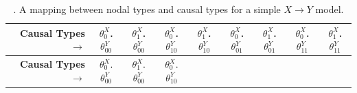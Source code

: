 \documentclass[12pt,]{book}
\begin{document}
\begin{longtable}[]{@{}rcccccccc@{}}
\caption{\label{tab:nodalcausalmatrix}. A mapping between nodal types and causal types for a simple \(X \rightarrow Y\) model.}\tabularnewline
\toprule
\begin{minipage}[b]{0.12\columnwidth}\raggedleft
\textbf{Causal Types \(\rightarrow\)}\strut
\end{minipage} & \begin{minipage}[b]{0.08\columnwidth}\centering
\(\theta^X_0\).\(\theta^Y_{00}\)\strut
\end{minipage} & \begin{minipage}[b]{0.08\columnwidth}\centering
\(\theta^X_1\).\(\theta^Y_{00}\)\strut
\end{minipage} & \begin{minipage}[b]{0.08\columnwidth}\centering
\(\theta^X_0\).\(\theta^Y_{10}\)\strut
\end{minipage} & \begin{minipage}[b]{0.08\columnwidth}\centering
\(\theta^X_1\).\(\theta^Y_{10}\)\strut
\end{minipage} & \begin{minipage}[b]{0.08\columnwidth}\centering
\(\theta^X_0\).\(\theta^Y_{01}\)\strut
\end{minipage} & \begin{minipage}[b]{0.08\columnwidth}\centering
\(\theta^X_1\).\(\theta^Y_{01}\)\strut
\end{minipage} & \begin{minipage}[b]{0.08\columnwidth}\centering
\(\theta^X_0\).\(\theta^Y_{11}\)\strut
\end{minipage} & \begin{minipage}[b]{0.08\columnwidth}\centering
\(\theta^X_1\).\(\theta^Y_{11}\)\strut
\end{minipage}\tabularnewline
\midrule
\endfirsthead
\toprule
\begin{minipage}[b]{0.12\columnwidth}\raggedleft
\textbf{Causal Types \(\rightarrow\)}\strut
\end{minipage} & \begin{minipage}[b]{0.08\columnwidth}\centering
\(\theta^X_0\).\(\theta^Y_{00}\)\strut
\end{minipage} & \begin{minipage}[b]{0.08\columnwidth}\centering
\(\theta^X_1\).\(\theta^Y_{00}\)\strut
\end{minipage} & \begin{minipage}[b]{0.08\columnwidth}\centering
\(\theta^X_0\).\(\theta^Y_{10}\)\strut

\end{minipage}
\end{longtable}
\end{document}
